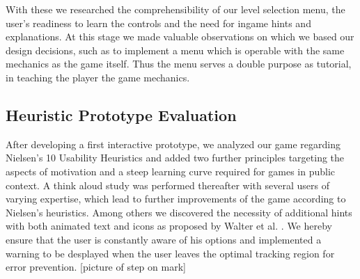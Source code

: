 \documentclass{chi-ext}
\begin{document}
With these we researched the comprehensibility of our level selection menu, the user's readiness to learn the controls and the need for ingame hints and explanations. At this stage we made valuable observations on which we based our design decisions, such as to implement a menu which is operable with the same mechanics as the game itself. Thus the menu serves a double purpose as tutorial, in teaching the player the game mechanics.
\subsection{Heuristic Prototype Evaluation}
After developing a first interactive prototype, we  analyzed our game regarding Nielsen’s 10 Usability Heuristics \cite{nielsen1995usability} and added two further principles targeting the aspects of motivation and a steep learning curve required for games in public context.
%
A think aloud study was performed thereafter with several users of varying expertise, which lead to further improvements of the game according to Nielsen's heuristics. Among others we discovered the necessity of additional hints with both animated text and icons as proposed by Walter et al. \cite{walter2013strikeapose}. We hereby ensure that the user is constantly aware of his options and implemented a warning to be desplayed when the user leaves the optimal tracking region for error prevention. [picture of step on mark]
\end{document}
